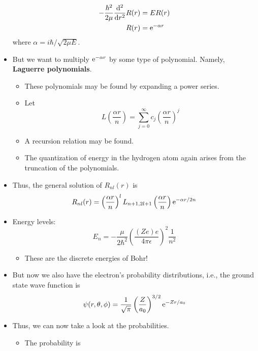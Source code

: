 \documentclass[../notes.tex]{subfiles}
\begin{document}
\begin{itemize}
\begin{align*}
        -\frac{\hbar^2}{2\mu}\dv[2]{r}R(r) &= ER(r)\\
        R(r) &= \e[-\alpha r]
    \end{align*}
    where $\alpha=i\hbar/\sqrt{2\mu E}$.
    \item But we want to multiply $\e[-\alpha r]$ by some type of polynomial. Namely, \textbf{Laguerre polynomials}.
    \begin{itemize}
        \item These polynomials may be found by expanding a power series.
        \item Let
        \begin{equation*}
            L\left( \frac{\alpha r}{n} \right) = \sum_{j=0}^\infty c_j\left( \frac{\alpha r}{n} \right)^j
        \end{equation*}
        \item A recursion relation may be found.
        \item The quantization of energy in the hydrogen atom again arises from the truncation of the polynomials.
    \end{itemize}
    \item Thus, the general solution of $R_{nl}(r)$ is
    \begin{equation*}
        R_{nl}(r) = \left( \frac{\alpha r}{n} \right)^lL_{n+1,2l+1}\left( \frac{\alpha r}{n} \right)\e[-\alpha r/2n]
    \end{equation*}
    \item Energy levels:
    \begin{equation*}
        E_n = -\frac{\mu}{2\hbar^2}\left( \frac{(Ze)e}{4\pi\epsilon} \right)^2\frac{1}{n^2}
    \end{equation*}
    \begin{itemize}
        \item These are the discrete energies of Bohr!
    \end{itemize}
    \item But now we also have the electron's probability distributions, i.e., the ground state wave function is
    \begin{equation*}
        \psi(r,\theta,\phi) = \frac{1}{\sqrt{\pi}}\left( \frac{Z}{a_0} \right)^{3/2}\e[-Zr/a_0]
    \end{equation*}
    \item Thus, we can now take a look at the probabilities.
    \begin{itemize}
        \item The probability is
        \begin{equation*}

\end{equation*}
\end{itemize}
\end{itemize}
\end{document}
